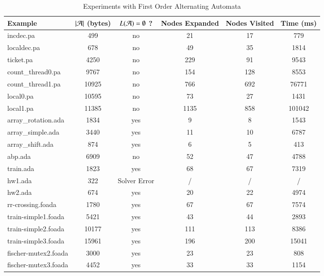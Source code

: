 \begin{table}[htb]
\begin{center}
{\fontsize{7}{8}\selectfont
\begin{tabular}{||l|c|c|c|c|c||}
\hline
Example & ${|{\mathcal{A}}|}$ (bytes) & $L(\mathcal{A})=\emptyset$ ? & Nodes Expanded & Nodes Visited & Time (ms) \\
\hline
incdec.pa & 499 & no & 21 & 17 & 779 \\
\hline
localdec.pa & 678 & no & 49 & 35 & 1814 \\
\hline
ticket.pa & 4250 & no & 229 & 91 & 9543 \\
\hline
count\_thread0.pa & 9767 & no & 154 & 128 & 8553 \\
\hline
count\_thread1.pa & 10925 & no & 766 & 692 & 76771 \\
\hline
local0.pa & 10595 & no & 73 & 27 & 1431 \\
\hline
local1.pa & 11385 & no & 1135 & 858 & 101042 \\
\hline
array\_rotation.ada & 1834 & yes & 9 & 8 & 1543 \\
\hline
array\_simple.ada & 3440 & yes & 11 & 10 & 6787 \\
\hline
array\_shift.ada & 874 & yes & 6 & 5 & 413 \\
\hline
abp.ada & 6909 & no & 52 & 47 & 4788 \\
\hline
train.ada & 1823 & yes & 68 & 67 & 7319 \\
\hline
hw1.ada & 322 & Solver Error & / & / & / \\
\hline
hw2.ada & 674 & yes & 20 & 22 & 4974 \\
\hline
rr-crossing.foada & 1780 & yes & 67 & 67 & 7574 \\
\hline
train-simple1.foada & 5421 & yes & 43 & 44 & 2893 \\
\hline
train-simple2.foada & 10177 & yes & 111 & 113 & 8386 \\
\hline
train-simple3.foada & 15961 & yes & 196 & 200 & 15041 \\
\hline
fischer-mutex2.foada & 3000 & yes & 23 & 23 & 808 \\
\hline
fischer-mutex3.foada & 4452 & yes & 33 & 33 & 1154 \\
\hline
\end{tabular}
}
\caption{Experiments with First Order Alternating Automata}
\label{tab:experiments}
\end{center}
\end{table}

